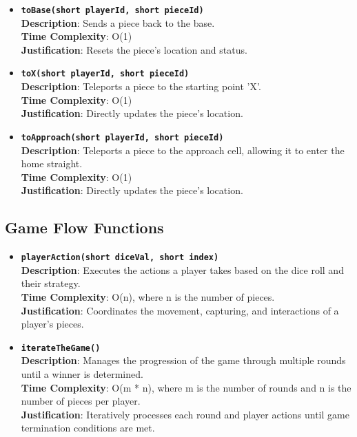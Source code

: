 \documentclass{article}
\begin{document}
\begin{itemize}
            \item \textbf{\texttt{toBase(short playerId, short pieceId)}}\\
            \textbf{Description}: Sends a piece back to the base.\\
            \textbf{Time Complexity}: O(1)\\
            \textbf{Justification}: Resets the piece’s location and status.
            
            \item \textbf{\texttt{toX(short playerId, short pieceId)}}\\
            \textbf{Description}: Teleports a piece to the starting point 'X'.\\
            \textbf{Time Complexity}: O(1)\\
            \textbf{Justification}: Directly updates the piece’s location.
            
            \item \textbf{\texttt{toApproach(short playerId, short pieceId)}}\\
            \textbf{Description}: Teleports a piece to the approach cell, allowing it to enter the home straight.\\
            \textbf{Time Complexity}: O(1)\\
            \textbf{Justification}: Directly updates the piece’s location.
        \end{itemize}
        
        \subsection{Game Flow Functions}
        
        \begin{itemize}
            \item \textbf{\texttt{playerAction(short diceVal, short index)}}\\
            \textbf{Description}: Executes the actions a player takes based on the dice roll and their strategy.\\
            \textbf{Time Complexity}: O(n), where n is the number of pieces.\\
            \textbf{Justification}: Coordinates the movement, capturing, and interactions of a player's pieces.
            
            \item \textbf{\texttt{iterateTheGame()}}\\
            \textbf{Description}: Manages the progression of the game through multiple rounds until a winner is determined.\\
            \textbf{Time Complexity}: O(m * n), where m is the number of rounds and n is the number of pieces per player.\\
            \textbf{Justification}: Iteratively processes each round and player actions until game termination conditions are met.
        \end{itemize}
        
\end{document}
